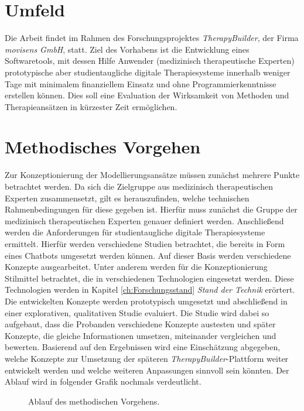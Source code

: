 \section{Umfeld}

Die Arbeit findet im Rahmen des Forschungsprojektes \emph{TherapyBuilder}, der Firma \emph{movisens GmbH}, statt. Ziel des Vorhabens ist die Entwicklung eines Softwaretools, mit dessen Hilfe Anwender (medizinisch therapeutische Experten) prototypische aber studientaugliche digitale Therapiesysteme innerhalb weniger Tage mit minimalem finanziellem Einsatz und ohne Programmierkenntnisse erstellen können. Dies soll eine Evaluation der Wirksamkeit von Methoden und Therapieansätzen in kürzester Zeit ermöglichen.


\section{Methodisches Vorgehen}

Zur Konzeptionierung der Modellierungsansätze müssen zunächst mehrere Punkte betrachtet werden. Da sich die Zielgruppe aus medizinisch therapeutischen Experten zusammensetzt, gilt es herauszufinden, welche technischen Rahmenbedingungen für diese gegeben ist. Hierfür muss zunächst die Gruppe der medizinisch therapeutischen Experten genauer definiert werden. Anschließend werden die Anforderungen für studientaugliche digitale Therapiesysteme ermittelt. Hierfür werden verschiedene Studien betrachtet, die bereits in Form eines Chatbots umgesetzt werden können. Auf dieser Basis werden verschiedene Konzepte ausgearbeitet. Unter anderem werden für die Konzeptionierung Stilmittel betrachtet, die in verschiedenen Technologien eingesetzt werden. Diese Technologien werden in Kapitel \ref{ch:Forschungsstand} \emph{Stand der Technik} erörtert. Die entwickelten Konzepte werden prototypisch umgesetzt und abschließend in einer explorativen, qualitativen Studie evaluiert. Die Studie wird dabei so aufgebaut, dass die Probanden verschiedene Konzepte austesten und später Konzepte, die gleiche Informationen umsetzen, miteinander vergleichen und bewerten. Basierend auf den Ergebnissen wird eine Einschätzung abgegeben, welche Konzepte zur Umsetzung der späteren \emph{TherapyBuilder}-Plattform weiter entwickelt werden und welche weiteren Anpassungen sinnvoll sein könnten. Der Ablauf wird in folgender Grafik nochmals verdeutlicht.

\begin{figure}[h]
\centering
{}
\caption{Ablauf des methodischen Vorgehens.}
\label{methVorgehen}
\end{figure}

